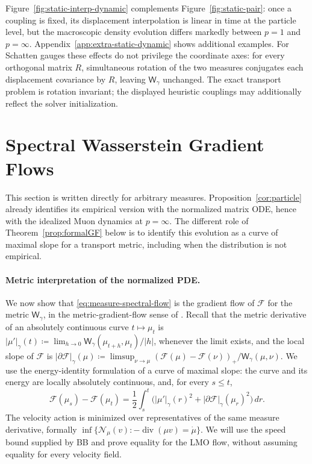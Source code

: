 \documentclass{article}
\newcommand{\MF}{\mathcal{F}}
\newcommand{\MN}{\mathcal{N}}
\newcommand{\Wg}{\mathsf{W}_{\gamma}}
\newcommand{\divv}{\operatorname{div}}
\begin{document}
Figure~\ref{fig:static-interp-dynamic} complements Figure~\ref{fig:static-pair}: once a coupling is fixed, its displacement interpolation is linear in time at the particle level, but the macroscopic density evolution differs markedly between $p=1$ and $p=\infty$. Appendix~\ref{app:extra-static-dynamic} shows additional examples.
For Schatten gauges these effects do not privilege the coordinate axes:
for every orthogonal matrix $R$, simultaneous rotation of the two measures
conjugates each displacement covariance by $R$, leaving $\Wg$ unchanged.
The exact transport problem is rotation invariant; the displayed heuristic
couplings may additionally reflect the solver initialization.

\section{Spectral Wasserstein Gradient Flows}
\label{sec:wasserstein-flows}

This section is written directly for arbitrary measures.
Proposition~\ref{cor:particle} already identifies its empirical version with
the normalized matrix ODE, hence with the idealized Muon dynamics at
$p=\infty$. The different role of Theorem~\ref{prop:formalGF} below is to
identify this evolution as a curve of maximal slope for a transport metric,
including when the distribution is not empirical.

\paragraph{Metric interpretation of the normalized PDE.}

We now show that \eqref{eq:measure-spectral-flow} is the gradient flow of
$\MF$ for the metric $\Wg$, in the metric-gradient-flow sense of
\citet{AmbrosioGigliSavare2008}.
%
Recall that the metric derivative of an absolutely continuous curve
$t\mapsto\mu_t$ is
$|\mu'|_{\gamma}(t)\coloneqq\lim_{h\to0}\Wg(\mu_{t+h},\mu_t)/|h|$, whenever
the limit exists, and the local slope of $\MF$ is
$|\partial\MF|_{\gamma}(\mu)\coloneqq
\limsup_{\nu\to\mu}(\MF(\mu)-\MF(\nu))_+/\Wg(\mu,\nu)$.
We use the energy-identity formulation of a curve of maximal slope: the curve
and its energy are locally absolutely continuous, and, for every $s\le t$,
\[
 \MF(\mu_s)-\MF(\mu_t)
 =\frac12\int_s^t\bigl(|\mu'|_\gamma(r)^2
                       +|\partial\MF|_\gamma(\mu_r)^2\bigr)\,dr.
\]
The velocity action is minimized over representatives of the same measure
derivative, formally
$\inf\{\MN_\mu(v):-\divv(\mu v)=\dot\mu\}$.
We will use the speed bound supplied by BB and prove equality for the LMO
flow, without assuming equality for every velocity field.
\end{document}
